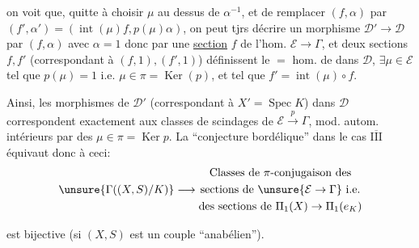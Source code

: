 

on voit que, quitte à choisir $\mu$ au dessus de  $\alpha^{-1}$, et de remplacer $(f,\alpha)$ par $(f',\alpha')=(\operatorname{int}(\mu)f,p(\mu)\alpha)$, on peut tjrs décrire un morphisme $\mathcal D'\to\mathcal D$ par $(f,\alpha)$ avec $\alpha=1$ donc par une \uline{section} $f$ de l'hom. $\mathcal E\to\Gamma$, et deux sections $f,f'$ (correspondant à $(f,1),(f',1)$) définissent le $=$ hom. de  dans $\mathcal D$,  $\exists\mu\in\mathcal E$ tel que $p(\mu)=1$ i.e. $\mu\in\pi=\operatorname{Ker}(p)$, et tel que $f'=\operatorname{int}(\mu)\circ f$.

Ainsi, les morphismes de $\mathcal D'$ (correspondant à $X'=\operatorname{Spec}K$) dans $\mathcal D$ correspondent exactement aux classes de scindages de $\mathcal E\xrightarrow{p}\Gamma$, mod. autom. intérieurs par des $\mu\in\pi=\operatorname{Ker}p$. La ``conjecture bordélique'' dans le cas \uline{$\overline{\mathrm{III}}$} équivaut donc à ceci:
\[
 \unsure{\Gamma((X,S)/K)}\longrightarrow
 \begin{gathered}
 \text{Classes de $\pi$-conjugaison des}\\
 \text{sections de }\unsure{\mathcal E\to\Gamma}\text{ i.e.}\\
 \text{des sections de }\Pi_1(X)\to\Pi_1(e_K)
 \end{gathered}
\]



est bijective (si $(X,S)$ est un couple ``anabélien'').

